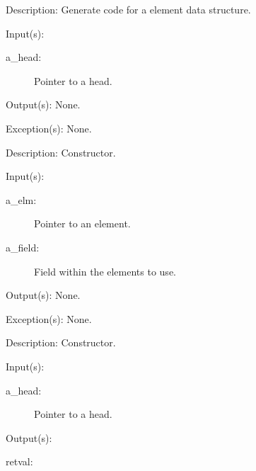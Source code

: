 \begin{capi}
\begin{capilist}
	\item[Description: ]
		Generate code for a  element data structure.
	\end{capilist}
\label{ql_new}
	\begin{capilist}
	\item[Input(s): ]
		\begin{description}\item[]
		\item[a\_head: ]
			Pointer to a  head.
		\end{description}
	\item[Output(s): ] None.
	\item[Exception(s): ] None.
	\item[Description: ]
		Constructor.
	\end{capilist}
\label{ql_elm_new}
	\begin{capilist}
	\item[Input(s): ]
		\begin{description}\item[]
		\item[a\_elm: ]
			Pointer to an element.
		\item[a\_field: ]
			Field within the  elements to use.
		\end{description}
	\item[Output(s): ] None.
	\item[Exception(s): ] None.
	\item[Description: ]
		Constructor.
	\end{capilist}
\label{ql_first}
	\begin{capilist}
	\item[Input(s): ]
		\begin{description}\item[]
		\item[a\_head: ]
			Pointer to a \classname{ql} head.
		\end{description}
	\item[Output(s): ]
		\begin{description}\item[]
		\item[retval: ]

\end{description}
\end{capilist}
\end{capi}
